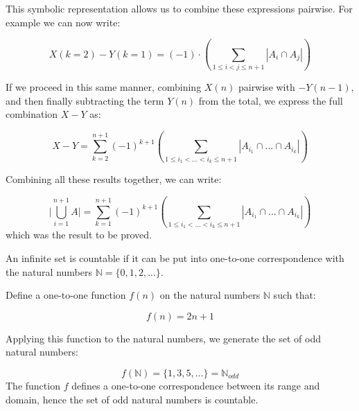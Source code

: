 \documentclass[a4paper,12pt]{article}
\begin{document}
This symbolic representation allows us to combine these expressions pairwise. For example we can now write:

\[ X(k=2) - Y(k=1) = (-1) \cdot \left(\sum_{1 \le i < j \le {n+1}} |A_i \cap A_j| \right) \]

If we proceed in this same manner, combining $X(n)$ pairwise with $-Y(n-1)$, and then finally subtracting the term $Y(n)$ from the total, we express the full combination $X-Y$ as:

\[ X-Y = \sum_{k=2}^{n+1} (-1)^{k+1} \left(\sum_{1 \le i_1 < ... < i_k \le {n+1}} |A_{i_1} \cap ... \cap A_{i_k}| \right) \]

Combining all these results together, we can write:

\[ \bigg| \bigcup_{i=1}^{n+1}{A} \bigg| = \sum_{k=1}^{n+1} (-1)^{k+1} \left(\sum_{1 \le i_1 < ... < i_k \le {n+1}} |A_{i_1} \cap ... \cap A_{i_k}| \right) \]
which was the result to be proved.

\vspace{5mm}

An infinite set is countable if it can be put into one-to-one correspondence with the natural numbers $\mathbb{N} = \{0, 1, 2, ... \}$.

Define a one-to-one function $f(n)$ on the natural numbers $\mathbb{N}$ such that:

\[ f(n) = 2n + 1 \]

Applying this function to the natural numbers, we generate the set of odd natural numbers: 

\[ f(\mathbb{N}) = \{1, 3, 5, ...\} = \mathbb{N}_{odd} \]
The function $f$ defines a one-to-one correspondence between its range and domain, hence the set of odd natural numbers is countable.

\vspace{5mm}
\end{document}
